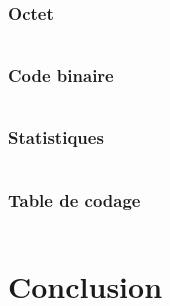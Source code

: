 \documentclass[12pt,a4paper]{article}
\begin{document}
\subsubsection{Octet}
    \inputminted[breaklines]{c}{../code/src/tests/testOctet.c}
\subsubsection{Code binaire}
    \inputminted[breaklines]{c}{../code/src/tests/testCodeBinaire.c}
\subsubsection{Statistiques}
    \inputminted[breaklines]{c}{../code/src/tests/testStats.c}
\subsubsection{Table de codage}
    \inputminted[breaklines]{c}{../code/src/tests/testTable.c}

\newpage

\section{Conclusion}


\end{document}
